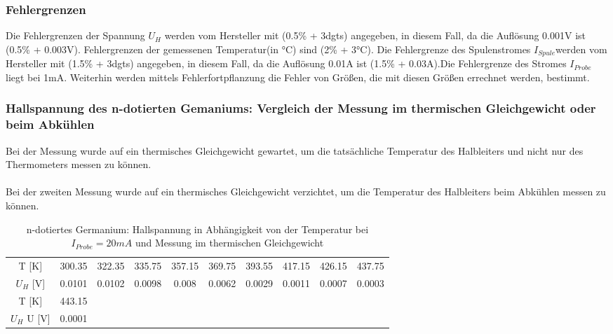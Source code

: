 \subsubsection{Fehlergrenzen}
Die Fehlergrenzen der Spannung $U_{H}$ werden vom Hersteller mit (0.5\% + 3dgts) angegeben, in diesem Fall, da die Auflösung 0.001V ist (0.5\% + 0.003V). Fehlergrenzen der gemessenen Temperatur(in °C) sind (2\% + 3°C). Die Fehlergrenze des Spulenstromes $I_{Spule}$werden vom Hersteller mit (1.5\% + 3dgts) angegeben, in diesem Fall, da die Auflösung 0.01A ist (1.5\% + 0.03A).Die Fehlergrenze des Stromes $I_{Probe}$ liegt bei 1mA. Weiterhin werden mittels Fehlerfortpflanzung die Fehler von Größen, die mit diesen Größen errechnet werden, bestimmt.\\

\subsubsection{Hallspannung des n-dotierten Gemaniums: Vergleich der Messung im thermischen Gleichgewicht oder beim Abkühlen}

Bei der Messung wurde auf ein thermisches Gleichgewicht gewartet, um die tatsächliche Temperatur des Halbleiters und nicht nur des Thermometers messen zu können.\\
\\
Bei der zweiten Messung wurde auf ein thermisches Gleichgewicht verzichtet, um die Temperatur des Halbleiters beim Abkühlen messen zu können.\\

\begin{table}[H]
\centering
\begin{tabular}{|c||c|c|c|c|c|c|c|c|c|}
\hline
T [K] & 300.35 & 322.35 & 335.75 & 357.15 & 369.75 & 393.55 & 417.15 & 426.15 & 437.75 \\
 $U_{H}$ [V] & 0.0101 & 0.0102 & 0.0098 & 0.008 & 0.0062 & 0.0029 & 0.0011 & 0.0007 & 0.0003  \\
 \hline
 T [K] &  443.15 &  &  &  & & & & & \\
$U_{H}$ U [V] & 0.0001
   &  & &  & & & & & \\
 \hline
\end{tabular}
\caption{n-dotiertes Germanium: Hallspannung in Abhängigkeit von der Temperatur bei $I_{Probe}=20mA$ und Messung im thermischen Gleichgewicht}
\end{table} 

